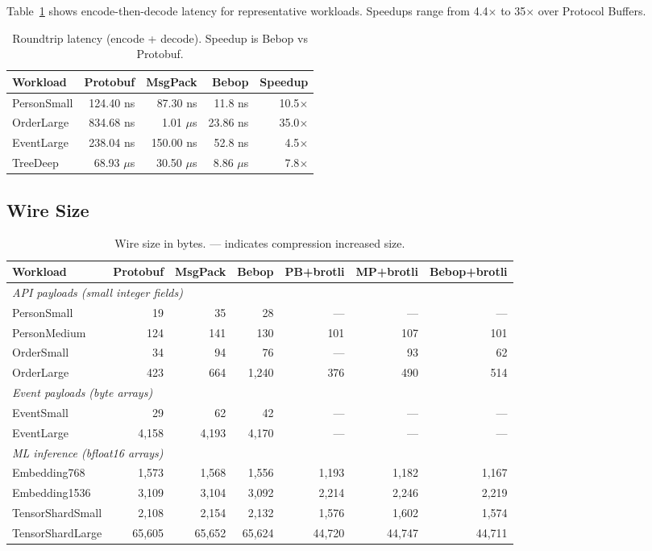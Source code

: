 \documentclass[10pt,onecolumn]{article}
\begin{document}
Table~\ref{tab:roundtrip} shows encode-then-decode latency for representative workloads. Speedups range from 4.4$\times$ to 35$\times$ over Protocol Buffers.

\begin{table}[ht]
\centering
\begin{tabular}{@{}lrrrr@{}}
\toprule
\textbf{Workload} & \textbf{Protobuf} & \textbf{MsgPack} & \textbf{Bebop} & \textbf{Speedup} \\
\midrule
PersonSmall & 124.40 ns & 87.30 ns & 11.8 ns & 10.5$\times$ \\
OrderLarge & 834.68 ns & 1.01 $\mu$s & 23.86 ns & 35.0$\times$ \\
EventLarge & 238.04 ns & 150.00 ns & 52.8 ns & 4.5$\times$ \\
TreeDeep & 68.93 $\mu$s & 30.50 $\mu$s & 8.86 $\mu$s & 7.8$\times$ \\
\bottomrule
\end{tabular}
\caption{Roundtrip latency (encode + decode). Speedup is Bebop vs Protobuf.}
\label{tab:roundtrip}
\end{table}

\subsection{Wire Size}

\begin{table}[ht]
\centering
\small
\begin{tabular}{l r r r r r r}
\toprule
\textbf{Workload} & \textbf{Protobuf} & \textbf{MsgPack} & \textbf{Bebop} & \textbf{PB+brotli} & \textbf{MP+brotli} & \textbf{Bebop+brotli} \\
\midrule
\multicolumn{7}{l}{\textit{API payloads (small integer fields)}} \\
PersonSmall & 19 & 35 & 28 & --- & --- & --- \\
PersonMedium & 124 & 141 & 130 & 101 & 107 & 101 \\
OrderSmall & 34 & 94 & 76 & --- & 93 & 62 \\
OrderLarge & 423 & 664 & 1,240 & 376 & 490 & 514 \\
\midrule
\multicolumn{7}{l}{\textit{Event payloads (byte arrays)}} \\
EventSmall & 29 & 62 & 42 & --- & --- & --- \\
EventLarge & 4,158 & 4,193 & 4,170 & --- & --- & --- \\
\midrule
\multicolumn{7}{l}{\textit{ML inference (bfloat16 arrays)}} \\
Embedding768 & 1,573 & 1,568 & 1,556 & 1,193 & 1,182 & 1,167 \\
Embedding1536 & 3,109 & 3,104 & 3,092 & 2,214 & 2,246 & 2,219 \\
TensorShardSmall & 2,108 & 2,154 & 2,132 & 1,576 & 1,602 & 1,574 \\
TensorShardLarge & 65,605 & 65,652 & 65,624 & 44,720 & 44,747 & 44,711 \\
\bottomrule
\end{tabular}
\caption{Wire size in bytes. --- indicates compression increased size.}
\label{tab:wire-size}
\end{table}
\end{document}
